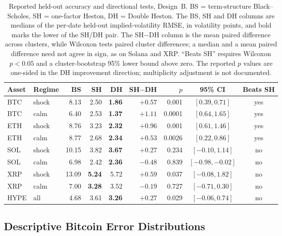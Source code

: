 \documentclass[runningheads]{llncs}
\begin{document}
\begin{table}[htbp]
\caption{Reported held-out accuracy and directional tests, Design~B.
BS = term-structure Black--Scholes, SH = one-factor Heston,
DH = Double Heston. The BS, SH and DH columns are medians of the
per-date held-out implied-volatility RMSE, in volatility points, and
bold marks the lower of the SH/DH pair. The SH$-$DH column is the mean
paired difference across clusters, while Wilcoxon tests paired cluster
differences; a median and a mean paired difference need not agree in
sign, as on Solana and XRP. ``Beats SH'' requires Wilcoxon $p < 0.05$
and a cluster-bootstrap 95\% lower bound above zero. The reported $p$
values are one-sided in the DH improvement direction; multiplicity
adjustment is not documented.}
\label{tab:results}
\centering
\setlength{\tabcolsep}{4pt}
\small
\begin{tabular}{llrrrrrcc}
\toprule
Asset & Regime & BS & SH & DH & SH$-$DH & $p$ & 95\% CI & Beats SH \\
\midrule
BTC  & shock &  8.13 & 2.50 & \textbf{1.86} & $+0.57$ & 0.001  & $[0.39, 0.71]$   & yes \\
BTC  & calm  &  6.40 & 2.53 & \textbf{1.37} & $+1.11$ & 0.0001 & $[0.64, 1.65]$   & yes \\
ETH  & shock &  8.76 & 3.23 & \textbf{2.32} & $+0.96$ & 0.001  & $[0.61, 1.46]$   & yes \\
ETH  & calm  &  8.77 & 2.68 & \textbf{2.34} & $+0.53$ & 0.0026 & $[0.22, 0.86]$   & yes \\
SOL  & shock & 10.15 & 3.82 & \textbf{3.67} & $+0.27$ & 0.234  & $[-0.10, 1.14]$  & no  \\
SOL  & calm  &  6.98 & 2.42 & \textbf{2.36} & $-0.48$ & 0.839  & $[-0.98, -0.02]$ & no  \\
XRP  & shock & 13.09 & \textbf{5.24} & 5.72 & $+0.59$ & 0.037  & $[-0.08, 1.82]$  & no  \\
XRP  & calm  &  7.00 & \textbf{3.28} & 3.52 & $-0.19$ & 0.727  & $[-0.71, 0.30]$  & no  \\
HYPE & all   &  4.68 & 3.61 & \textbf{3.26} & $+0.27$ & 0.029  & $[-0.06, 0.74]$  & no  \\
\bottomrule
\end{tabular}
\end{table}

\subsection{Descriptive Bitcoin Error Distributions}
\label{sec:ecdf}
\end{document}
